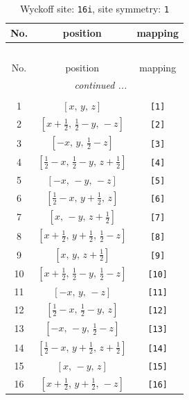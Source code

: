 \documentclass[fleqn,8pt]{jsarticle}
\begin{document}
\begin{longtable}{ccc}
\caption{Wyckoff site: {\tt 16i}, site symmetry: {\tt 1}}
 \\
 \hline \hline
No. & position & mapping \\ \hline \endfirsthead

\multicolumn{2}{l}{\tablename\ \thetable{}} \\
 \hline \hline
No. & position & mapping \\ \hline \endhead

 \hline \hline
\multicolumn{2}{r}{\footnotesize\it continued ...} \\ \endfoot

 \hline \hline
\multicolumn{2}{r}{} \\ \endlastfoot

1 & $\left[ x,\, y,\, z \right]$ & {\tt [1]} \\ \hline
2 & $\left[ x + \frac{1}{2},\, \frac{1}{2} - y,\, - z \right]$ & {\tt [2]} \\ \hline
3 & $\left[ - x,\, y,\, \frac{1}{2} - z \right]$ & {\tt [3]} \\ \hline
4 & $\left[ \frac{1}{2} - x,\, \frac{1}{2} - y,\, z + \frac{1}{2} \right]$ & {\tt [4]} \\ \hline
5 & $\left[ - x,\, - y,\, - z \right]$ & {\tt [5]} \\ \hline
6 & $\left[ \frac{1}{2} - x,\, y + \frac{1}{2},\, z \right]$ & {\tt [6]} \\ \hline
7 & $\left[ x,\, - y,\, z + \frac{1}{2} \right]$ & {\tt [7]} \\ \hline
8 & $\left[ x + \frac{1}{2},\, y + \frac{1}{2},\, \frac{1}{2} - z \right]$ & {\tt [8]} \\ \hline
9 & $\left[ x,\, y,\, z + \frac{1}{2} \right]$ & {\tt [9]} \\ \hline
10 & $\left[ x + \frac{1}{2},\, \frac{1}{2} - y,\, \frac{1}{2} - z \right]$ & {\tt [10]} \\ \hline
11 & $\left[ - x,\, y,\, - z \right]$ & {\tt [11]} \\ \hline
12 & $\left[ \frac{1}{2} - x,\, \frac{1}{2} - y,\, z \right]$ & {\tt [12]} \\ \hline
13 & $\left[ - x,\, - y,\, \frac{1}{2} - z \right]$ & {\tt [13]} \\ \hline
14 & $\left[ \frac{1}{2} - x,\, y + \frac{1}{2},\, z + \frac{1}{2} \right]$ & {\tt [14]} \\ \hline
15 & $\left[ x,\, - y,\, z \right]$ & {\tt [15]} \\ \hline
16 & $\left[ x + \frac{1}{2},\, y + \frac{1}{2},\, - z \right]$ & {\tt [16]} \\
\end{longtable}
\end{document}
